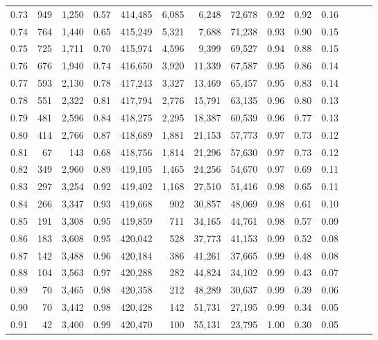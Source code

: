 \begin{tabular}{rrrrrrrrrrrrrr}
0.73 &    949 &  1,250 &  0.57 &  414,485 &    6,085 &   6,248 &  72,678 &  0.92 &  0.92 &      0.16 \\
0.74 &    764 &  1,440 &  0.65 &  415,249 &    5,321 &   7,688 &  71,238 &  0.93 &  0.90 &      0.15 \\
0.75 &    725 &  1,711 &  0.70 &  415,974 &    4,596 &   9,399 &  69,527 &  0.94 &  0.88 &      0.15 \\
0.76 &    676 &  1,940 &  0.74 &  416,650 &    3,920 &  11,339 &  67,587 &  0.95 &  0.86 &      0.14 \\
0.77 &    593 &  2,130 &  0.78 &  417,243 &    3,327 &  13,469 &  65,457 &  0.95 &  0.83 &      0.14 \\
0.78 &    551 &  2,322 &  0.81 &  417,794 &    2,776 &  15,791 &  63,135 &  0.96 &  0.80 &      0.13 \\
0.79 &    481 &  2,596 &  0.84 &  418,275 &    2,295 &  18,387 &  60,539 &  0.96 &  0.77 &      0.13 \\
0.80 &    414 &  2,766 &  0.87 &  418,689 &    1,881 &  21,153 &  57,773 &  0.97 &  0.73 &      0.12 \\
0.81 &     67 &    143 &  0.68 &  418,756 &    1,814 &  21,296 &  57,630 &  0.97 &  0.73 &      0.12 \\
0.82 &    349 &  2,960 &  0.89 &  419,105 &    1,465 &  24,256 &  54,670 &  0.97 &  0.69 &      0.11 \\
0.83 &    297 &  3,254 &  0.92 &  419,402 &    1,168 &  27,510 &  51,416 &  0.98 &  0.65 &      0.11 \\
0.84 &    266 &  3,347 &  0.93 &  419,668 &      902 &  30,857 &  48,069 &  0.98 &  0.61 &      0.10 \\
0.85 &    191 &  3,308 &  0.95 &  419,859 &      711 &  34,165 &  44,761 &  0.98 &  0.57 &      0.09 \\
0.86 &    183 &  3,608 &  0.95 &  420,042 &      528 &  37,773 &  41,153 &  0.99 &  0.52 &      0.08 \\
0.87 &    142 &  3,488 &  0.96 &  420,184 &      386 &  41,261 &  37,665 &  0.99 &  0.48 &      0.08 \\
0.88 &    104 &  3,563 &  0.97 &  420,288 &      282 &  44,824 &  34,102 &  0.99 &  0.43 &      0.07 \\
0.89 &     70 &  3,465 &  0.98 &  420,358 &      212 &  48,289 &  30,637 &  0.99 &  0.39 &      0.06 \\
0.90 &     70 &  3,442 &  0.98 &  420,428 &      142 &  51,731 &  27,195 &  0.99 &  0.34 &      0.05 \\
0.91 &     42 &  3,400 &  0.99 &  420,470 &      100 &  55,131 &  23,795 &  1.00 &  0.30 &      0.05 \\

\end{tabular}

